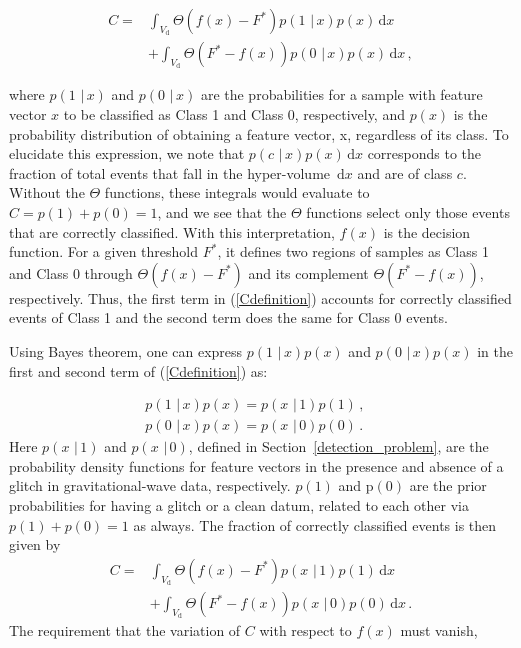 \documentclass[prd, twocolumn, lengthcheck, superscriptaddress, showpacs, letterpaper, nofootinbib]{revtex4-1}
\newcommand\given{\,\,|\,}
\newcommand\auxvec{x}
\newcommand\Vdata{V_\mathrm{d}}
\newcommand\Ft{\ensuremath{F^\ast}}
\newcommand\diff{\, \mathrm{d}}
\begin{document}
\begin{align}
\label{Cdefinition}
C =&    \int_{\Vdata}\! \Theta\left(f(\auxvec) - \Ft \right) p(1 \given \auxvec)p(\auxvec) \diff \auxvec \nonumber \\
 & + \int_{\Vdata}\! \Theta\left(\Ft - f(\auxvec) \right) p(0 \given \auxvec)p(\auxvec) \diff \auxvec \,,
 \end{align}

\noindent where  $p(1 \given \auxvec)$ and $p(0 \given \auxvec)$  are the probabilities for a sample with feature vector $\auxvec$ to be classified as Class 1 and Class 0, respectively, and $p(\auxvec)$ is the probability distribution of obtaining a feature vector, \auxvec, regardless of its class. To elucidate this expression, we note that $p(c\given\auxvec)p(\auxvec)\diff \auxvec$ corresponds to the fraction of total events that fall in the hyper-volume $\diff \auxvec$ and are of class $c$. Without the $\Theta$ functions, these integrals would evaluate to $C = p(1) + p(0) = 1$, and we see that the $\Theta$ functions select only those events that are correctly classified. With this interpretation, $f(\auxvec)$ is the decision function. For a given threshold $\Ft$, it defines two regions of samples as Class 1 and Class 0 through $\Theta\left(f(\auxvec) - \Ft \right)$ and its complement $\Theta\left(\Ft - f(\auxvec) \right)$, respectively. Thus, the first term in (\ref{Cdefinition}) accounts for correctly classified events of Class 1 and the second term does the same for Class 0 events. 

Using Bayes theorem, one can express   $p(1 \given \auxvec)p(\auxvec)$ and $p(0 \given \auxvec)p(\auxvec)$ in the first and second term of (\ref{Cdefinition}) as:

\begin{subequations}
\label{bayesrelations}
\begin{align}
p(1 \given \auxvec)p(\auxvec) = p(\auxvec \given 1)p(1)\,,&\\
p(0 \given \auxvec)p(\auxvec) = p(\auxvec \given 0)p(0) \,.
 \end{align}
\end{subequations}
Here $p(\auxvec \given 1)$ and $p(\auxvec \given 0)$, defined in Section~\ref{detection_problem}, are the probability density functions for feature vectors in the  presence and absence of a glitch in gravitational-wave data, respectively. $p(1)$ and p$(0)$ are the prior probabilities for having a glitch or a clean datum, related to each other via $p(1) + p(0) = 1$ as always. The fraction of correctly classified events is then given by
\begin{align}
\label{Cfinal}
C =& \int_{\Vdata}\! \Theta\left(f(\auxvec) - \Ft \right)p(\auxvec \given 1)p(1) \diff \auxvec \nonumber \\
& +\int_{\Vdata}\!\Theta\left(\Ft - f(\auxvec) \right) p(\auxvec \given 0)p(0) \diff \auxvec \,.
\end{align}
The requirement that the variation of $C$ with respect to $f(\auxvec)$ must vanish,
\end{document}
